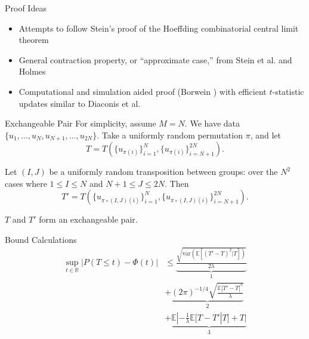 \documentclass{beamer}
\newcommand{\var}{\mathrm{var}}
\newcommand{\E}{\mathbb{E}}
\begin{document}
\begin{frame}{Proof Ideas}
  \begin{itemize}
  \item  Attempts to follow Stein's \cite{stein1986approximate} 
    proof of the Hoeffding combinatorial central limit theorem \pause
  \item  General contraction property, or ``approximate case,''
    from Stein et al. \cite{stein2004use} and Holmes
    \cite{holmes2004stein} \pause
  \item Computational and simulation aided proof (Borwein
    \cite{borwein2004mathematics}) with efficient $t$-statistic
    updates similar to Diaconis et al. \cite{diaconis1994gray}
  \end{itemize}
\end{frame}

\begin{frame}{Exchangeable Pair}
  For simplicity, assume $M = N$.  We have data $\{u_1, \ldots, u_N,
  u_{N+1}, \ldots, u_{2N}\}$.  Take a uniformly random permutation
  $\pi$, and let 
  \begin{equation*}
    T = T \left (\{u_{\pi(i)}\}_{i=1}^{N},
      \{u_{\pi(i)}\}_{i=N+1}^{2N} \right).
  \end{equation*}
  \pause
  
  Let $(I, J)$ be a uniformly random transposition between groups:
  over the $N^2$ cases where $1 \leq I \leq N$ and $N + 1 \leq J \leq
  2N$. Then 
  \begin{equation*}
    T' = T \left (\{u_{\pi \circ (I, J) (i)}\}_{i=1}^{N},
      \{u_{\pi \circ (I, J) (i)}\}_{i=N+1}^{2N} \right).
  \end{equation*}

  $T$ and $T'$ form an exchangeable pair.
\end{frame}

\begin{frame}{Bound Calculations}
  \begin{align*}
    \sup_{t \in \mathbb{R}} |P(T \leq t) - \Phi(t)| &\leq 
  \underbrace{\frac{\sqrt{\var(\E[(T'-T)^2|T])}}{2\lambda}}_1 \\ &+ 
  \underbrace{(2\pi)^{-1/4}\sqrt{\frac{\E|T'-T|^3}{\lambda}}}_2 \\ &+ 
  \underbrace{\E|-\frac{1}{\lambda}\E[T-T'|T]+T|}_3
  \end{align*}
\end{frame}
\end{document}
